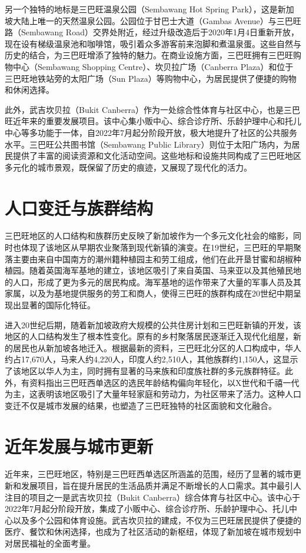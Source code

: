 \documentclass[11pt,a4paper,twoside,openany]{book}
\begin{document}
另一个独特的地标是三巴旺温泉公园（Sembawang Hot Spring Park），这是新加坡大陆上唯一的天然温泉公园。公园位于甘巴士大道（Gambas Avenue）与三巴旺路（Sembawang Road）交界处附近，经过升级改造后于2020年1月4日重新开放，现在设有梯级温泉池和咖啡馆，吸引着众多游客前来泡脚和煮温泉蛋。这些自然与历史的结合，为三巴旺增添了独特的魅力。在商业设施方面，三巴旺拥有三巴旺购物中心（Sembawang Shopping Centre）、坎贝拉广场（Canberra Plaza）和位于三巴旺地铁站旁的太阳广场（Sun Plaza）等购物中心，为居民提供了便捷的购物和休闲选择。

此外，武吉坎贝拉（Bukit Canberra）作为一处综合性体育与社区中心，也是三巴旺近年来的重要发展项目。该中心集小贩中心、综合诊疗所、乐龄护理中心和托儿中心等多功能于一体，自2022年7月起分阶段开放，极大地提升了社区的公共服务水平。三巴旺公共图书馆（Sembawang Public Library）则位于太阳广场内，为居民提供了丰富的阅读资源和文化活动空间。这些地标和设施共同构成了三巴旺地区多元化的城市景观，既保留了历史的痕迹，又展现了现代化的活力。

\section{人口变迁与族群结构}
三巴旺地区的人口结构和族群历史反映了新加坡作为一个多元文化社会的缩影，同时也体现了该地区从早期农业聚落到现代新镇的演变。在19世纪，三巴旺的早期聚落主要由来自中国南方的潮州籍种植园主和劳工组成，他们在此开垦甘蜜和胡椒种植园。随着英国海军基地的建立，该地区吸引了来自英国、马来亚以及其他殖民地的人口，形成了更为多元的居民构成。海军基地的运作带来了大量的军事人员及其家属，以及为基地提供服务的劳工和商人，使得三巴旺的族群构成在20世纪中期呈现出显著的国际化特征。

进入20世纪后期，随着新加坡政府大规模的公共住房计划和三巴旺新镇的开发，该地区的人口结构发生了根本性变化。原有的乡村聚落居民逐渐迁入现代化组屋，新的居民也从新加坡各地迁入。根据最新的资料，三巴旺北分区的人口构成中，华人约占17,670人，马来人约4,220人，印度人约2,510人，其他族群约1,150人，这显示了该地区以华人为主，同时拥有显著的马来族和印度族社群的多元族群特征。此外，有资料指出三巴旺西单选区的选民年龄结构偏向年轻化，以X世代和千禧一代为主，这表明该地区吸引了大量年轻家庭和劳动力，为社区带来了活力。这种人口变迁不仅是城市发展的结果，也塑造了三巴旺独特的社区面貌和文化融合。

\section{近年发展与城市更新}
近年来，三巴旺地区，特别是三巴旺西单选区所涵盖的范围，经历了显著的城市更新和发展项目，旨在提升居民的生活品质并满足不断增长的人口需求。其中最引人注目的项目之一是武吉坎贝拉（Bukit Canberra）综合体育与社区中心。该中心于2022年7月起分阶段开放，集成了小贩中心、综合诊疗所、乐龄护理中心、托儿中心以及多个公园和体育设施。武吉坎贝拉的建成，不仅为三巴旺居民提供了便捷的医疗、餐饮和休闲选择，也成为了社区活动的新枢纽，体现了新加坡在城市规划中对居民福祉的全面考量。
\end{document}
